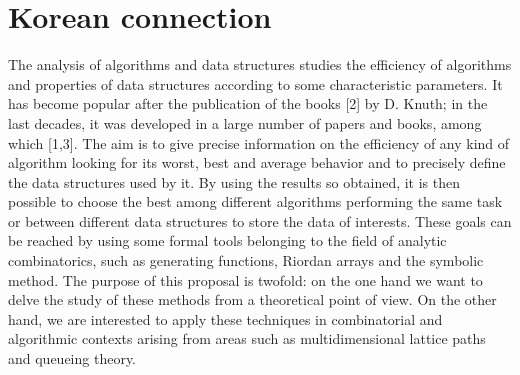 
\section{Korean connection} The analysis of algorithms and data
structures studies the efficiency of algorithms and properties of data
structures according to some characteristic parameters. It has become
popular after the publication of the books [2] by D. Knuth; in the last
decades, it was developed in a large number of papers and books, among
which [1,3]. The aim is to give precise information on the efficiency of
any kind of algorithm looking for its worst, best and average behavior
and to precisely define the data structures used by it. By using the
results so obtained, it is then possible to choose the best among
different algorithms performing the same task or between different data
structures to store the data of interests. These goals can be reached by
using some formal tools belonging to the field of analytic
combinatorics, such as generating functions, Riordan arrays and the
symbolic method. The purpose of this proposal is twofold: on the one
hand we want to delve the study of these methods from a theoretical
point of view. On the other hand, we are interested to apply these
techniques in combinatorial and algorithmic contexts arising from areas
such as multidimensional lattice paths and queueing theory.


